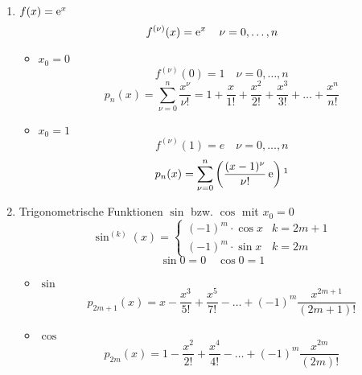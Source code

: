 \begin{example}
  \begin{enumerate}
    \item $f(x) = \operatorname{e}^x$
      \[ f^{(\nu)}(x) = \operatorname{e}^x \quad \nu = 0, \ldots, n \]
      \begin{itemize}
        \item $x_0 = 0$
          \[ f^{(\nu)}(0) = 1 \quad \nu = 0, \ldots, n \]
          \[ p_n(x) = \sum_{\nu = 0}^n \frac{x^\nu}{\nu !} = 1 + \frac x {1!} + \frac{x^2}{2!} + \frac{x^3}{3!} + \ldots + \frac{x^n}{n!} \]

          \begin{center}
          \end{center}

        \item $x_0 = 1$
          \[ f^{(\nu)}(1) = e \quad \nu = 0, \ldots, n \]
          \[ p_n(x) = \sum_{\nu = 0}^n \left( \frac{(x-1)^\nu}{\nu !} \euler \right)\annotation{\text{für $x = 1$ und $\nu = 0$ ist der Zähler $(1-1)^0 = 0^0 = 1$}} \]
      \end{itemize}
    \item Trigonometrische Funktionen $\sin$ bzw. $\cos$ mit $x_0 = 0$
      \[ \sin^{(k)}(x) = 
        \begin{cases}
          (-1)^m \cdot \cos x & k = 2m+1 \\
          (-1)^m \cdot \sin x & k = 2m
        \end{cases}
      \]
      \[ \sin 0 = 0 \quad \cos 0 = 1 \]
      \begin{itemize}
        \item $\sin$
          \[ p_{2m+1}(x) = x - \frac{x^3}{5!} + \frac{x^5}{7!} - \ldots + (-1)^m \frac{x^{2m+1}}{(2m+1)!} \]
        \item $\cos$
          \[ p_{2m}(x) = 1 - \frac{x^2}{2!} + \frac{x^4}{4!} - \ldots + (-1)^m \frac{x^{2m}}{(2m)!} \]
      \end{itemize}
  \end{enumerate}
\end{example}

